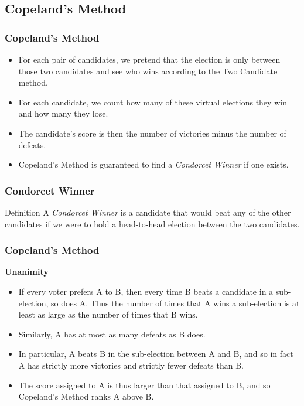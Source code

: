 \documentclass{beamer}
\newcommand{\heading}[1]{{\Large\bfseries #1}\vspace{1em}}
\begin{document}
    \subsection{Copeland's Method}
    \begin{frame}
        \frametitle{Copeland's Method}
    
        \begin{itemize}
            \item For each pair of candidates, we pretend that the election is only between those two candidates and see who wins according to the Two Candidate method. \pause
            \item For each candidate, we count how many of these virtual elections they win and how many they lose. \pause
            \item The candidate's score is then the number of victories minus the number of defeats. \pause
            \item Copeland's Method is guaranteed to find a \emph{Condorcet Winner} if one exists.
        \end{itemize}
    
    \end{frame}
    \begin{frame}
        \frametitle{Condorcet Winner}
    
        \begin{block}{Definition}
            A \emph{Condorcet Winner} is a candidate that would beat any of the other candidates if we were to hold a head-to-head election between the two candidates.
        \end{block}
    
    \end{frame}
    \begin{frame}
        \frametitle{Copeland's Method}
        \heading{Unanimity}

        \begin{itemize}
            \item If every voter prefers A to B, then every time B beats a candidate in a sub-election, so does A. Thus the number of times that A wins a sub-election is at least as large as the number of times that B wins. \pause
            \item Similarly, A has at most as many defeats as B does.
            \item In particular, A beats B in the sub-election between A and B, and so in fact A has strictly more victories and strictly fewer defeats than B.
            \item The score assigned to A is thus larger than that assigned to B, and so Copeland's Method ranks A above B.
        \end{itemize}
    
    \end{frame}
\end{document}

